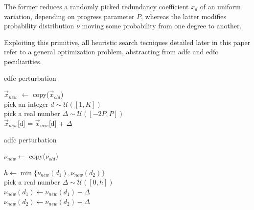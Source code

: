 \documentclass[12pt,journal,draftclsnofoot,onecolumn]{IEEEtran}
\begin{document}
The former reduces a randomly picked redundancy coefficient $x_d$ of an uniform variation, depending on progress parameter $P$, whereas the latter modifies probability distribution $\nu$ moving some probability from one degree to another.

Exploiting this primitive, all heuristic search tecniques detailed later in this paper refer to a general optimization problem, abstracting from \gls{adfc} and \gls{edfc} peculiarities.

\begin{algorithm}[htp]
\caption{\gls{edfc} perturbation} \label{algo:perturb_edfc}

 {
	$\vec{x}_{new}$ $\gets$ copy($\vec{x}_{old}$) \\
	pick an integer $d \sim \mathcal{U}([1, K])$ \\
	pick a real number $\Delta \sim \mathcal{U}([-2P, P])$ \\
	$\vec{x}_{new}$[d] = $\vec{x}_{new}$[d] + $\Delta$
}
\end{algorithm}

\begin{algorithm}[htp]
\caption{\gls{adfc} perturbation} \label{algo:perturb_adfc}
	 {
		$\nu_{new} \gets$ copy($\nu_{old}$) \\


		$ h \gets \min\{\nu_{new}(d_1), \nu_{new}(d_2)\} $ \\
		pick a real number $\Delta \sim \mathcal{U}([0, h])$ \\

		$\nu_{new}(d_1) \gets \nu_{new}(d_1) - \Delta$ \\
		$\nu_{new}(d_2) \gets \nu_{new}(d_2) + \Delta$ \\
	}
\end{algorithm}

\clearpage
\end{document}

